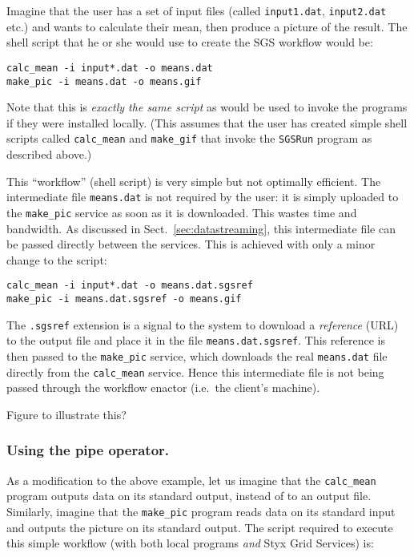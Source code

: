 \documentclass{llncs}
\begin{document}
Imagine that the user has a set of input files (called {\tt input1.dat}, {\tt input2.dat} etc.) and wants to calculate their mean, then produce a picture of the result.  The shell script that he or she would use to create the SGS workflow would be:

\begin{verbatim}
calc_mean -i input*.dat -o means.dat
make_pic -i means.dat -o means.gif
\end{verbatim}

Note that this is {\em exactly the same script\/} as would be used to invoke the programs if they were installed locally.  (This assumes that the user has created simple shell scripts called {\tt calc\_mean} and {\tt make\_gif} that invoke the {\tt SGSRun} program as described above.)

This ``workflow'' (shell script) is very simple but not optimally efficient.  The intermediate file {\tt means.dat} is not required by the user: it is simply uploaded to the {\tt make\_pic} service as soon as it is downloaded.  This wastes time and bandwidth.  As discussed in Sect.~\ref{sec:datastreaming}, this intermediate file can be passed directly between the services.  This is achieved with only a minor change to the script:

\begin{verbatim}
calc_mean -i input*.dat -o means.dat.sgsref
make_pic -i means.dat.sgsref -o means.gif
\end{verbatim}

The {\tt .sgsref} extension is a signal to the system to download a {\em reference\/} (URL) to the output file and place it in the file {\tt means.dat.sgsref}.  This reference is then passed to the {\tt make\_pic} service, which downloads the real {\tt means.dat} file directly from the {\tt calc\_mean} service.  Hence this intermediate file is not being passed through the workflow enactor (i.e.\ the client's machine).

Figure to illustrate this?

\subsubsection{Using the pipe operator.}\label{sec:pipes}
As a modification to the above example, let us imagine that the {\tt calc\_mean} program outputs data on its standard output, instead of to an output file.  Similarly, imagine that the {\tt make\_pic} program reads data on its standard input and outputs the picture on its standard output.  The script required to execute this simple workflow (with both local programs {\em and\/} Styx Grid Services) is:
\end{document}

